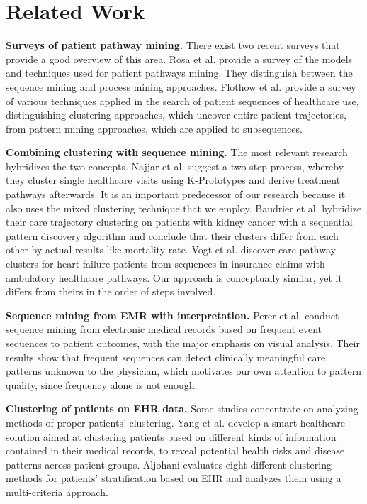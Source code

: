 \section{Related Work}
\label{sec:related}

\textbf{Surveys of patient pathway mining.} There exist two recent surveys that provide a good overview of this area. Rosa et al. \cite{rosa2022modelling} provide a survey of the models and techniques used for patient pathways mining. They distinguish between the sequence mining and process mining approaches. Flothow et al. \cite{flothow2023} provide a survey of various techniques applied in the search of patient sequences of healthcare use, distinguishing clustering approaches, which uncover entire patient trajectories, from pattern mining approaches, which are applied to subsequences.

\textbf{Combining clustering with sequence mining.} The most relevant research hybridizes the two concepts. Najjar et al. \cite{najjar2018} suggest a two-step process, whereby they cluster single healthcare visits using K-Prototypes and derive treatment pathways afterwards. It is an important predecessor of our research because it also uses the mixed clustering technique that we employ. Baudrier et al. \cite{baudrier2022} hybridize their care trajectory clustering on patients with kidney cancer with a sequential pattern discovery algorithm and conclude that their clusters differ from each other by actual results like mortality rate. Vogt et al. \cite{vogt2018} discover care pathway clusters for heart-failure patients from sequences in insurance claims with ambulatory healthcare pathways. Our approach is conceptually similar, yet it differs from theirs in the order of steps involved.

\textbf{Sequence mining from EMR with interpretation.} Perer et al. \cite{perer2015} conduct sequence mining from electronic medical records based on frequent event sequences to patient outcomes, with the major emphasis on visual analysis. Their results show that frequent sequences can detect clinically meaningful care patterns unknown to the physician, which motivates our own attention to pattern quality, since frequency alone is not enough.

\textbf{Clustering of patients on EHR data.} Some studies concentrate on analyzing methods of proper patients' clustering. Yang et al. \cite{yang2024} develop a smart-healthcare solution aimed at clustering patients based on different kinds of information contained in their medical records, to reveal potential health risks and disease patterns across patient groups. Aljohani \cite{aljohani2024} evaluates eight different clustering methods for patients' stratification based on EHR and analyzes them using a multi-criteria approach.


